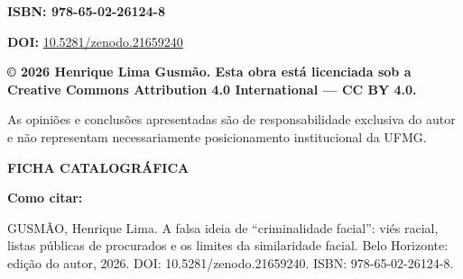 \documentclass[12pt,oneside,a4paper,openany,brazil]{abntex2}
\newcommand{\frontheading}[1]{\par\noindent\textbf{#1}\par\vspace{3pt}}
\begin{document}
\textbf{ISBN: 978-65-02-26124-8}\par
\textbf{DOI:} \uline{10.5281/zenodo.21659240}\par\vspace{10pt}
\textbf{© 2026 Henrique Lima Gusmão. Esta obra está licenciada sob a Creative Commons Attribution 4.0 International --- CC BY 4.0.}\par\vspace{10pt}
\begin{center}\begin{minipage}{0.92\linewidth}\centering As opiniões e conclusões apresentadas são de responsabilidade exclusiva do autor e não representam necessariamente posicionamento institucional da UFMG.\end{minipage}\end{center}
\vspace{7pt}
\frontheading{FICHA CATALOGRÁFICA}
\begingroup\fontsize{9.5}{10.8}\selectfont
\setlength{\fboxsep}{8pt}\noindent{}
\endgroup
\vspace{9pt}
\frontheading{Como citar:}
\fontsize{9.8}{11.5}\selectfont GUSMÃO, Henrique Lima. A falsa ideia de ``criminalidade facial'': viés racial, listas públicas de procurados e os limites da similaridade facial. Belo Horizonte: edição do autor, 2026. DOI: 10.5281/zenodo.21659240. ISBN: 978-65-02-26124-8.
\endgroup
\clearpage
\end{document}
